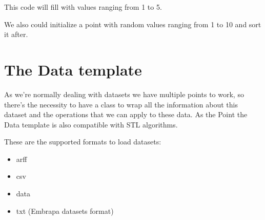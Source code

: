 \documentclass[letterpaper,10pt,english]{sphinxmanual}
\begin{document}
\sphinxAtStartPar
This code will fill  with values ranging from 1 to 5.

\sphinxAtStartPar
We also could initialize a point with random values ranging from 1 to 10 and sort it after.

\begin{sphinxVerbatim}[commandchars=\\\{\}]
 

      
 
\end{sphinxVerbatim}


\section{The Data template}
\label{\detokenize{getting_started/datamanagement:the-data-template}}
\sphinxAtStartPar
As we’re normally dealing with datasets we have multiple points to work, so there’s the necessity to have a class to wrap all the information about this dataset and the operations that we can apply to these data. As the
Point the Data template is also compatible with STL algorithms.

\sphinxAtStartPar
These are the supported formats to load datasets:
\begin{itemize}
\item {} 
\sphinxAtStartPar
arff

\item {} 
\sphinxAtStartPar
csv

\item {} 
\sphinxAtStartPar
data

\item {} 
\sphinxAtStartPar
txt (Embrapa datasets format)

\end{itemize}
\end{document}

